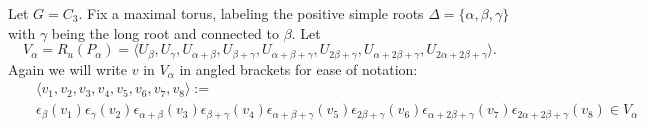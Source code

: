 \begin{example} Let $G=C_3$. Fix a maximal torus, labeling the positive simple roots $\Delta=\{\alpha, \beta, \gamma\}$ with $\gamma$ being the long root and connected to $\beta$. Let 
	\begin{displaymath}
		V_\alpha = R_u(P_\alpha) = \langle U_\beta, U_\gamma, U_{\alpha+\beta}, U_{\beta+\gamma}, U_{\alpha+\beta+\gamma}, U_{2\beta+\gamma}, U_{\alpha+2\beta+\gamma}, U_{2\alpha+2\beta+\gamma}\rangle.
	\end{displaymath}
	Again we will write $v$ in $V_\alpha$ in angled brackets for ease of notation:
	\begin{eqnarray*}
		&&\langle 
		v_1,
		v_2,
		v_3,
		v_4,
		v_5,
		v_6,
		v_7,
		v_8
		\rangle :=\\
		&&\epsilon_{\beta}(v_1)
		\epsilon_{\gamma}(v_2)
		\epsilon_{\alpha+\beta}(v_3)
		\epsilon_{\beta+\gamma}(v_4)
		\epsilon_{\alpha+\beta+\gamma}(v_5)
		\epsilon_{2\beta+\gamma}(v_6)
		\epsilon_{\alpha+2\beta+\gamma}(v_7)
		\epsilon_{2\alpha+2\beta+\gamma}(v_8) \in V_\alpha
	\end{eqnarray*}
		

\end{example}
